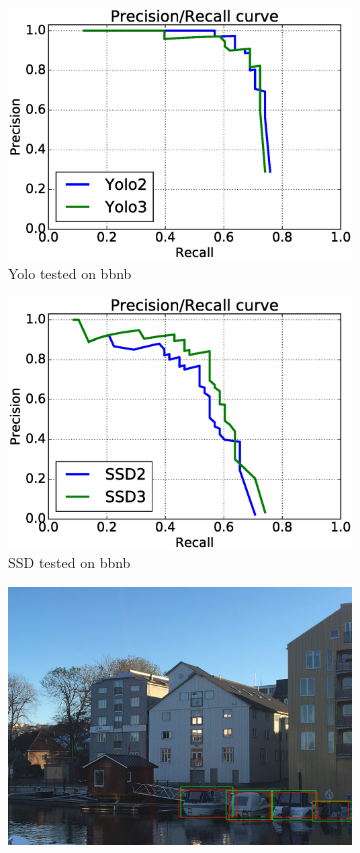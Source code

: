\begin{figure}[h!]
\begin{subfigure}{.5\textwidth}
  \centering
  \includegraphics[width=0.8\linewidth]{results/case_buildings/prec_recall/yolo/bb.eps}
  \caption{Yolo tested on bbnb}
  \label{fig:ex_bnbb_prec_rec_yolo}
\end{subfigure}%
\begin{subfigure}{.5\textwidth}
  \centering
  \includegraphics[width=.8\linewidth]{results/case_buildings/prec_recall/ssd/bb.eps}
  \caption{SSD tested on bbnb}
  \label{fig:ex_bnbb_prec_rec_ssd}
\end{subfigure}
\begin{subfigure}{.5\textwidth}
  \centering
  \includegraphics[width=0.8\linewidth]{results/case_buildings/prec_recall/yolo/IMG_2077_bbnb.jpg}

\end{subfigure}
\end{figure}
